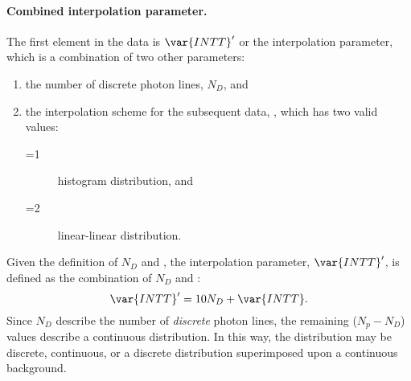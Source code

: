 \paragraph{Combined interpolation parameter.}\label{par:INTT}
The first element in the data is $\var{INTT}'$ or the interpolation parameter, which is a combination of two other parameters:
\begin{enumerate}
  \item the number of discrete photon lines, $N_{D}$, and
  \item the interpolation scheme for the subsequent data, , which has two valid values:
    \begin{description}
      \item[=1] histogram distribution, and 
      \item[=2] linear-linear distribution.
    \end{description}
\end{enumerate}
Given the definition of $N_{D}$ and , the interpolation parameter, $\var{INTT}'$, is defined as the combination of $N_{D}$ and :
\begin{equation}
  \var{INTT}' = 10N_{D}+\var{INTT}.
  \label{eq::INTT'}
\end{equation}
Since $N_D$ describe the number of \emph{discrete} photon lines, the remaining ($N_{p}-N_{D}$) values describe a continuous distribution. In this way, the distribution may be discrete, continuous, or a discrete distribution superimposed upon a continuous background.

